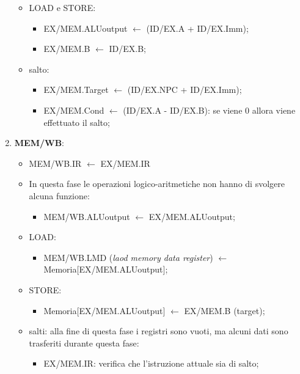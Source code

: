 \documentclass{article}
\begin{document}
\begin{enumerate}
\begin{itemize}
			\item LOAD e STORE:
				\begin{itemize}
					\item EX/MEM.ALUoutput $\leftarrow$ (ID/EX.A + ID/EX.Imm);

					\item EX/MEM.B $\leftarrow$ ID/EX.B;
				\end{itemize}

			\item salto:
				\begin{itemize}
					\item EX/MEM.Target $\leftarrow$ (ID/EX.NPC + ID/EX.Imm);

					\item EX/MEM.Cond $\leftarrow$ (ID/EX.A - ID/EX.B): se viene 0 allora viene effettuato il salto;
				\end{itemize}
		\end{itemize}

	\item \textbf{MEM/WB}:
		\begin{itemize}
			\item MEM/WB.IR $\leftarrow$ EX/MEM.IR

			\item In questa fase le operazioni logico-aritmetiche non hanno di svolgere alcuna funzione:
			\begin{itemize}
				\item MEM/WB.ALUoutput $\leftarrow$ EX/MEM.ALUoutput;
			\end{itemize}

			\item LOAD:
				\begin{itemize}
					\item MEM/WB.LMD (\textit{laod memory data register}) $\leftarrow$ Memoria[EX/MEM.ALUoutput];
				\end{itemize}

			\item STORE:
				\begin{itemize}
					\item Memoria[EX/MEM.ALUoutput] $\leftarrow$ EX/MEM.B (target);
				\end{itemize}

			\item salti: alla fine di questa fase i registri sono vuoti, ma alcuni dati sono trasferiti durante questa fase:
			  \begin{itemize}
			 	 \item EX/MEM.IR: verifica che l'istruzione attuale sia di salto;


\end{itemize}
\end{itemize}
\end{enumerate}
\end{document}
